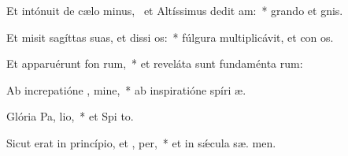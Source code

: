 \item Et intónuit de cælo minus,~\pscross{} et Altíssimus dedit  am:~* grando et  gnis.
\item Et misit sagíttas suas, et dissi os:~* fúlgura multiplicávit, et con os.
\item Et apparuérunt fon rum,~* et reveláta sunt fundaménta  rum:
\item Ab increpatióne , mine,~* ab inspiratióne spíri  æ.
\item Glória Pa,  lio,~* et Spi to.
\item Sicut erat in princípio, et ,  per,~* et in sǽcula sæ. men.
